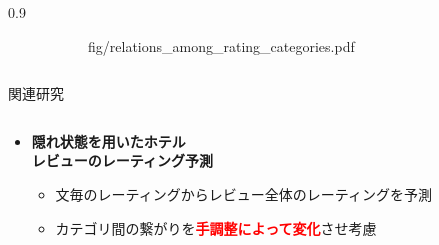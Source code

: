 \documentclass[unicode,10pt]{beamer}
\newlength{\mycolumnwidth}
\newcommand{\itemtitle}[1]{\textbf{#1}\\}
\newcommand{\fire}[1]{\textcolor{red}{\textbf{#1}}}
\begin{document}
\begin{frame}[t]
\begin{columns}[onlytextwidth,t]
\begin{column}{0.9\mycolumnwidth}
\begin{figure}
\begin{subfigure}[t]{0.475\linewidth}
                        {fig/relations_among_rating_categories.pdf}
      \end{subfigure}
      \hspace*{\fill} %
    \end{figure}
    \vspace{0.5em}
  \end{column}
\end{columns}

\begin{block}{関連研究}
  \begin{columns}[onlytextwidth,t]
    \begin{column}{0.3\textwidth}
      \begin{itemize}
        \item \itemtitle{隠れ状態を用いたホテル\\レビューのレーティング予測
                         \cite{fujitani15}}
          \begin{itemize}
            \item 文毎のレーティングからレビュー全体のレーティングを予測
            \item カテゴリ間の繋がりを\fire{手調整によって変化}させ考慮
          \end{itemize}
      \end{itemize}
    \end{column}


\end{columns}
\end{block}
\end{frame}
\end{document}
